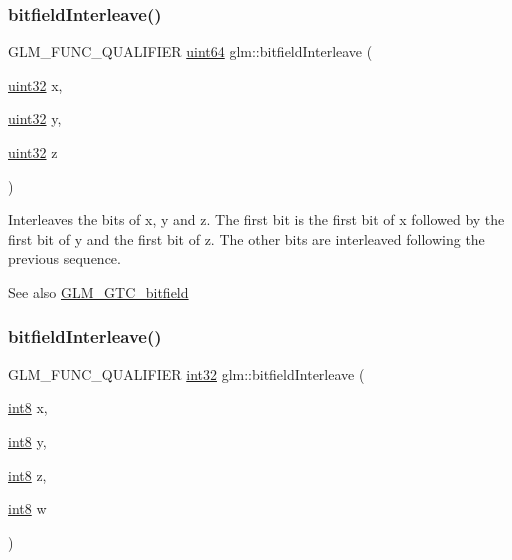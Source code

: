 \subsubsection{\texorpdfstring{bitfield\+Interleave()}{bitfieldInterleave()}\hspace{0.1cm}{\footnotesize\ttfamily [12/16]}}
{\footnotesize\ttfamily G\+L\+M\+\_\+\+F\+U\+N\+C\+\_\+\+Q\+U\+A\+L\+I\+F\+I\+ER \hyperlink{group__gtc__type__precision_gae3632bf9b37da66233d78930dd06378a}{uint64} glm\+::bitfield\+Interleave (\begin{DoxyParamCaption}\item[{\hyperlink{group__gtc__type__precision_ga202b6a53c105fcb7e531f9b443518451}{uint32}}]{x,  }\item[{\hyperlink{group__gtc__type__precision_ga202b6a53c105fcb7e531f9b443518451}{uint32}}]{y,  }\item[{\hyperlink{group__gtc__type__precision_ga202b6a53c105fcb7e531f9b443518451}{uint32}}]{z }\end{DoxyParamCaption})}

Interleaves the bits of x, y and z. The first bit is the first bit of x followed by the first bit of y and the first bit of z. The other bits are interleaved following the previous sequence.

\begin{DoxySeeAlso}{See also}
\hyperlink{group__gtc__bitfield}{G\+L\+M\+\_\+\+G\+T\+C\+\_\+bitfield} 
\end{DoxySeeAlso}
\mbox{\label{group__gtc__bitfield_ga7da84ecc2b3a46c9c08a9f40012359cf}} 
\subsubsection{\texorpdfstring{bitfield\+Interleave()}{bitfieldInterleave()}\hspace{0.1cm}{\footnotesize\ttfamily [13/16]}}
{\footnotesize\ttfamily G\+L\+M\+\_\+\+F\+U\+N\+C\+\_\+\+Q\+U\+A\+L\+I\+F\+I\+ER \hyperlink{group__gtc__type__precision_ga632d8b25f6b61659f39ea4321fab92a4}{int32} glm\+::bitfield\+Interleave (\begin{DoxyParamCaption}\item[{\hyperlink{group__gtc__type__precision_ga96254f9c1c4506fc8eb5cf3301ce8565}{int8}}]{x,  }\item[{\hyperlink{group__gtc__type__precision_ga96254f9c1c4506fc8eb5cf3301ce8565}{int8}}]{y,  }\item[{\hyperlink{group__gtc__type__precision_ga96254f9c1c4506fc8eb5cf3301ce8565}{int8}}]{z,  }\item[{\hyperlink{group__gtc__type__precision_ga96254f9c1c4506fc8eb5cf3301ce8565}{int8}}]{w }\end{DoxyParamCaption})}

